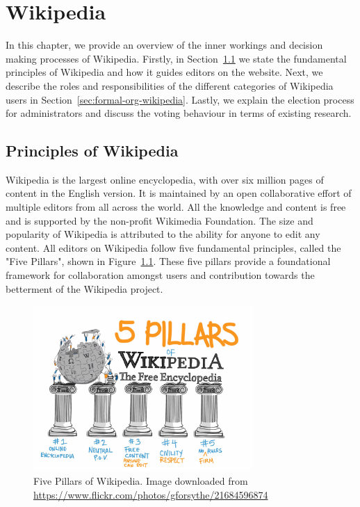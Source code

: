 \chapter{Wikipedia}
\label{chp:wikipedia}
In this chapter, we provide an overview of the inner workings and decision making processes of Wikipedia. Firstly, in Section~\ref{sec:principles-wikipedia} we state the fundamental principles of Wikipedia and how it guides editors on the website. Next, we describe the roles and responsibilities of the  different categories of Wikipedia users in Section~\ref{sec:formal-org-wikipedia}. Lastly, we explain the election process for administrators and discuss the voting behaviour in terms of existing research. 

\section{Principles of Wikipedia}
\label{sec:principles-wikipedia}
Wikipedia is the largest online encyclopedia, with over six million pages of content in the English version. It is maintained by an open collaborative effort of multiple editors from all across the world. All the knowledge and content is free and is supported by the non-profit Wikimedia Foundation. The size and popularity of Wikipedia is attributed to the ability for anyone to edit any content. All editors on Wikipedia follow five fundamental principles, called the "Five Pillars", shown in Figure~\ref{fig:5-pillars}. 
These five pillars provide a foundational framework for collaboration amongst users and contribution towards the betterment of the Wikipedia project.  
\begin{figure}[!ht]
    \centering
    \includegraphics[width=0.75\textwidth]{images/Pillars.jpg}
    \caption{Five Pillars of Wikipedia. Image downloaded from \url{https://www.flickr.com/photos/gforsythe/21684596874}}
    \label{fig:5-pillars}   
\end{figure}


